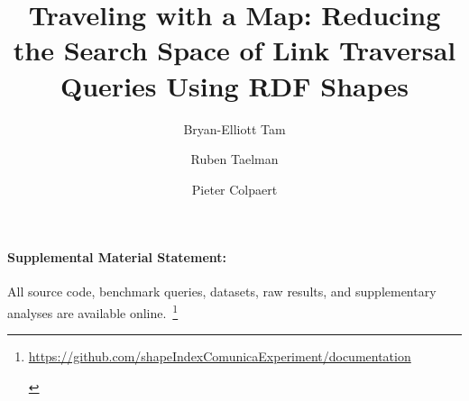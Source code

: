 \documentclass[runningheads]{llncs}
\newif\ifanonymous
\begin{document}
%
\title{Traveling with a Map: Reducing the Search Space of Link Traversal Queries Using RDF Shapes}
%
%
\ifanonymous
    \author{Anonymous}
\else
    \author{Bryan-Elliott Tam \and
    Ruben Taelman \and
    Pieter Colpaert}
\fi


%
\maketitle              %
%










\paragraph*{Supplemental Material Statement:}\label{sec:supplementalMaterial} All source code, benchmark queries, datasets, raw results, and supplementary analyses are available online.~\footnote{
    \ifanonymous
       \url{https://anonymous.4open.science/r/documentation-1A65}
    \else
       \url{https://github.com/shapeIndexComunicaExperiment/documentation}
    \fi 
    \label{sf:supplementalMaterial}}
%


\printbibliography
{}
\end{document}
